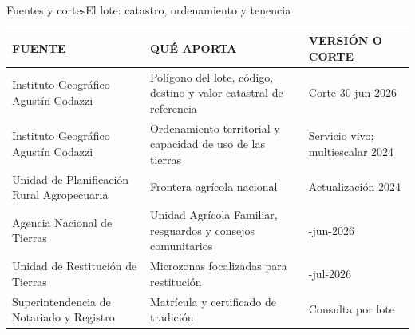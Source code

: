\documentclass[aspectratio=169, 11pt]{beamer}
\renewcommand{\arraystretch}{1.25}
\begin{document}
%
\begin{frame}{Fuentes y cortes}{El lote: catastro, ordenamiento y tenencia}
  {\scriptsize\renewcommand{\arraystretch}{1.14}\setlength{\tabcolsep}{4pt}
  \begin{tabular}{@{}>{\raggedright\arraybackslash}p{4.55cm} >{\raggedright\arraybackslash}p{4.95cm} >{\raggedright\arraybackslash}p{3.90cm}@{}}
    \toprule
    \textcolor{tinta3}{FUENTE} & \textcolor{tinta3}{QUÉ APORTA} & \textcolor{tinta3}{VERSIÓN O CORTE}\\
    \midrule
    Instituto Geográfico Agustín Codazzi & Polígono del lote, código, destino y valor catastral de referencia & Corte 30-jun-2026\\
    Instituto Geográfico Agustín Codazzi & Ordenamiento territorial y capacidad de uso de las tierras & Servicio vivo; multiescalar 2024\\
    Unidad de Planificación Rural Agropecuaria & Frontera agrícola nacional & Actualización 2024\\
    Agencia Nacional de Tierras & Unidad Agrícola Familiar, resguardos y consejos comunitarios & 25-jun-2026\\
    Unidad de Restitución de Tierras & Microzonas focalizadas para restitución & 31-jul-2026\\
    Superintendencia de Notariado y Registro & Matrícula y certificado de tradición & Consulta por lote\\
    \bottomrule
  \end{tabular}}
\end{frame}
\end{document}
